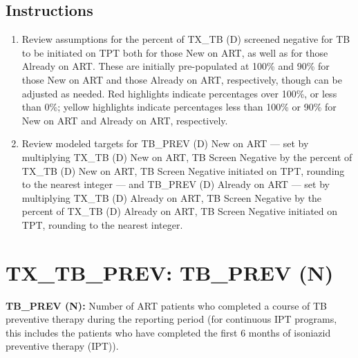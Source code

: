 \documentclass[
  openany]{book}
\begin{document}
\hypertarget{instructions-34}{%
\subsection{Instructions}\label{instructions-34}}

\begin{enumerate}
\def\labelenumi{\arabic{enumi}.}
\item
  Review assumptions for the percent of TX\_TB (D) screened negative
  for TB to be initiated on TPT both for those New on ART, as well as
  for those Already on ART. These are initially pre-populated at 100\%
  and 90\% for those New on ART and those Already on ART, respectively,
  though can be adjusted as needed. Red highlights indicate
  percentages over 100\%, or less than 0\%; yellow highlights indicate
  percentages less than 100\% or 90\% for New on ART and Already on ART,
  respectively.
\item
  Review modeled targets for TB\_PREV (D) New on ART --- set by
  multiplying TX\_TB (D) New on ART, TB Screen Negative by the percent
  of TX\_TB (D) New on ART, TB Screen Negative initiated on TPT,
  rounding to the nearest integer --- and TB\_PREV (D) Already on ART
  --- set by multiplying TX\_TB (D) Already on ART, TB Screen Negative
  by the percent of TX\_TB (D) Already on ART, TB Screen Negative
  initiated on TPT, rounding to the nearest integer.
\end{enumerate}

\hypertarget{tx_tb_prev-tb_prev-n}{%
\section{TX\_TB\_PREV: TB\_PREV (N)}\label{tx_tb_prev-tb_prev-n}}

\textbf{TB\_PREV (N):} Number of ART patients who completed a course of TB
preventive therapy during the reporting period (for continuous IPT
programs, this includes the patients who have completed the first 6
months of isoniazid preventive therapy (IPT)).
\end{document}
